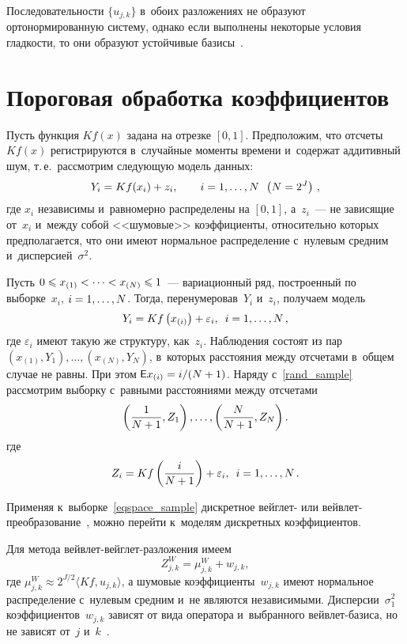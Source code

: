 \begin{multicols}{2}
Последовательности $\{u_{j,k}\}$ в~обоих разложениях не образуют ортонормированную систему,
однако если выполнены некоторые условия гладкости, то они образуют
устойчивые базисы~\cite{Lee97, KS11-1}.

\section{Пороговая обработка коэффициентов}

Пусть функция $Kf(x)$ задана на отрезке $[0,1]$. Предположим, что отсчеты~$Kf(x)$ 
регистрируются в~случайные моменты времени и~содержат аддитивный шум, т.\,е.\
 рассмотрим следующую модель данных:
\begin{equation*}
Y_i = K f(x_i) + z_i, \qquad i = 1, \dots, N\enskip \left(N=2^J\right)\,,
\end{equation*}
где $x_i$ независимы и~равномерно распределены на $[0,1]$, а~$z_{i}$~--- 
не зависящие от~$x_i$ и~между собой <<шумовые>> коэффициенты, относительно 
которых предполагается, что они имеют нормальное распределение с~нулевым 
средним и~дисперсией~$\sigma^2$.

Пусть $0\leqslant x_{(1)}<\cdots< x_{(N)}\hm\leqslant 1$~--- 
вариационный ряд, построенный по выборке~$x_i$, $i\hm=1,\ldots,N$. Тогда, перенумеровав~$Y_i$ 
и~$z_i$, получаем модель
\begin{equation}
\label{rand_sample}
Y_i=Kf\left(x_{(i)}\right)+\varepsilon_i,\enskip i=1,\ldots,N\,,
\end{equation}
где $\varepsilon_i$ имеют такую же структуру, как~$z_{i}$.
Наблюдения состоят из пар $(x_{(1)},Y_1),\ldots, (x_{(N)},Y_N)$, 
в~которых расстояния между отсчетами в~общем случае не равны. При этом 
$\e x_{(i)}\hm=i/(N+1)$. Наряду с~\eqref{rand_sample} рассмотрим выборку с~равными 
расстояниями между отсчетами
\begin{equation}
\label{eqspace_sample}
\left(\displaystyle\frac{\displaystyle 1\mathstrut}{\displaystyle N+1\mathstrut},Z_1\right),\ldots, \left(\displaystyle\frac{\displaystyle N\mathstrut}{\displaystyle N+1\mathstrut},Z_N\right).
\end{equation}
где
\begin{equation*}
Z_i=Kf\left(\displaystyle\frac{\displaystyle i\mathstrut}{\displaystyle N+1\mathstrut}\right)+\varepsilon_i,\enskip i=1,\ldots,N\,.
\end{equation*}

Применяя к~выборке~\eqref{eqspace_sample} дискретное вейглет- или 
вейв\-лет-пре\-об\-ра\-зо\-ва\-ние~\cite{ESH14-1, EKS15}, можно перейти к~моделям дискретных коэффициентов.

Для метода вейв\-лет-вейг\-лет-раз\-ло\-же\-ния имеем
\begin{equation}                                                                         
\label{WVD_model}
Z^{W}_{j,k} = \mu^{W}_{j,k} +  w_{j,k},
\end{equation}
где $\mu^{W}_{j,k}\approx 2^{J/2}\langle K f, u_{j,k}\rangle$, а шумовые коэффициенты~$w_{j,k}$ 
имеют нормальное распределение с~нулевым средним и~не являются независимыми.\linebreak 
Дисперсии~$\sigma_1^2$ коэффициентов~$w_{j,k}$ зависят от вида оператора и~выбранного вейв\-лет-ба\-зи\-са, 
но не зависят от~$j$ и~$k$~\cite{J99}.


\end{multicols}
